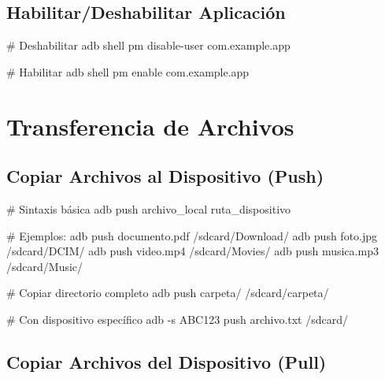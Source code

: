 \documentclass[
  doc,
  floatsintext,
  longtable,
  a4paper,
  nolmodern,
  notxfonts,
  notimes,
  12pt,
  colorlinks=true,linkcolor=blue,citecolor=blue,urlcolor=blue]{apa7}
\newenvironment{Shaded}{\begin{snugshade}}{\end{snugshade}}
\newcommand{\AttributeTok}[1]{\textcolor[rgb]{0.40,0.45,0.13}{#1}}
\newcommand{\CommentTok}[1]{\textcolor[rgb]{0.37,0.37,0.37}{#1}}
\newcommand{\ExtensionTok}[1]{\textcolor[rgb]{0.00,0.23,0.31}{#1}}
\newcommand{\NormalTok}[1]{\textcolor[rgb]{0.00,0.23,0.31}{#1}}
\begin{document}
\subsection{Habilitar/Deshabilitar
Aplicación}\label{habilitardeshabilitar-aplicaciuxf3n}

\begin{Shaded}
\begin{Highlighting}[]
\CommentTok{\# Deshabilitar}
\ExtensionTok{adb}\NormalTok{ shell pm disable{-}user com.example.app}

\CommentTok{\# Habilitar}
\ExtensionTok{adb}\NormalTok{ shell pm enable com.example.app}
\end{Highlighting}
\end{Shaded}

\section{Transferencia de Archivos}\label{transferencia-de-archivos}

\subsection{Copiar Archivos al Dispositivo
(Push)}\label{copiar-archivos-al-dispositivo-push}

\begin{Shaded}
\begin{Highlighting}[]
\CommentTok{\# Sintaxis básica}
\ExtensionTok{adb}\NormalTok{ push archivo\_local ruta\_dispositivo}

\CommentTok{\# Ejemplos:}
\ExtensionTok{adb}\NormalTok{ push documento.pdf /sdcard/Download/}
\ExtensionTok{adb}\NormalTok{ push foto.jpg /sdcard/DCIM/}
\ExtensionTok{adb}\NormalTok{ push video.mp4 /sdcard/Movies/}
\ExtensionTok{adb}\NormalTok{ push musica.mp3 /sdcard/Music/}

\CommentTok{\# Copiar directorio completo}
\ExtensionTok{adb}\NormalTok{ push carpeta/ /sdcard/carpeta/}

\CommentTok{\# Con dispositivo específico}
\ExtensionTok{adb} \AttributeTok{{-}s}\NormalTok{ ABC123 push archivo.txt /sdcard/}
\end{Highlighting}
\end{Shaded}

\subsection{Copiar Archivos del Dispositivo
(Pull)}\label{copiar-archivos-del-dispositivo-pull}
\end{document}
